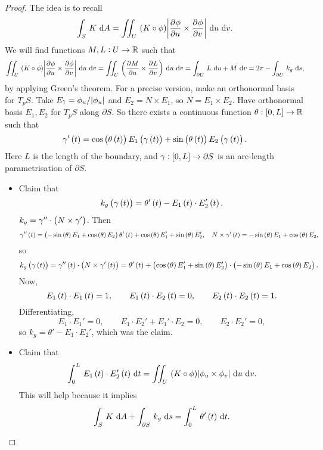 \begin{proof}
The idea is to recall
$$ \intd{S}{}{K}{A} = \iintd{U}{\br{K \circ \phi}\abs{\dpd{\phi}{u} \times \dpd{\phi}{v}}}{u}{v}. $$
We will find functions $ M, L : U \to \mathbb{R} $ such that
$$ \iintd{U}{\br{K \circ \phi}\abs{\dpd{\phi}{u} \times \dpd{\phi}{v}}}{u}{v} = \iintd{U}{\br{\dpd{M}{u} \times \dpd{L}{v}}}{u}{v} = \int_{\partial U} \, L \, \dif u + M \, \dif v = 2\pi - \intd{\partial U}{}{k_g}{s}, $$
by applying Green's theorem. For a precise version, make an orthonormal basis for $ T_pS $. Take $ E_1 = \phi_u / \abs{\phi_u} $ and $ E_2 = N \times E_1 $, so $ N = E_1 \times E_2 $. Have orthonormal basis $ E_1, E_2 $ for $ T_pS $ along $ \partial S $. So there exists a continuous function $ \theta : \sbr{0, L} \to \R $ such that
$$ \gamma'\br{t} = \cos\br{\theta\br{t}}E_1\br{\gamma\br{t}} + \sin\br{\theta\br{t}}E_2\br{\gamma\br{t}}. $$
Here $ L $ is the length of the boundary, and $ \gamma : \sbr{0, L} \to \partial S $ is an arc-length parametrisation of $ \partial S $.
\begin{itemize}
\item Claim that
$$ k_g\br{\gamma\br{t}} = \theta'\br{t} - E_1\br{t} \cdot E_2'\br{t}. $$
$ k_g = \gamma'' \cdot \br{N \times \gamma'} $. Then
$$ \gamma''\br{t} = \br{-\sin\br{\theta}E_1 + \cos\br{\theta}E_2}\theta'\br{t} + \cos\br{\theta}E_1' + \sin\br{\theta}E_2', \quad N \times \gamma'\br{t} = -\sin\br{\theta}E_1 + \cos\br{\theta}E_2, $$
so
$$ k_g\br{\gamma\br{t}} = \gamma''\br{t} \cdot \br{N \times \gamma'\br{t}} = \theta'\br{t} + \br{\cos\br{\theta}E_1' + \sin\br{\theta}E_2'} \cdot \br{-\sin\br{\theta}E_1 + \cos\br{\theta}E_2}. $$
Now,
$$ E_1\br{t} \cdot E_1\br{t} = 1, \qquad E_1\br{t} \cdot E_2\br{t} = 0, \qquad E_2\br{t} \cdot E_2\br{t} = 1. $$
Differentiating,
$$ E_1 \cdot E_1' = 0, \qquad E_1 \cdot E_2' + E_1' \cdot E_2 = 0, \qquad E_2 \cdot E_2' = 0, $$
so $ k_g = \theta' - E_1 \cdot E_2' $, which was the claim.


\item Claim that
$$ \intd{0}{L}{E_1\br{t} \cdot E_2'\br{t}}{t} = \iintd{U}{\br{K \circ \phi}\abs{\phi_u \times \phi_v}}{u}{v}. $$
This will help because it implies
$$ \intd{S}{}{K}{A} + \intd{\partial S}{}{k_g}{s} = \intd{0}{L}{\theta'\br{t}}{t}. $$

\pagebreak


\end{itemize}
\end{proof}
